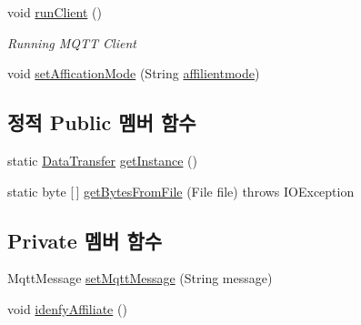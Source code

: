 \begin{DoxyCompactItemize}
\item 
void \mbox{\hyperlink{classcom_1_1github_1_1aites_1_1framework_1_1communicate_1_1_data_transfer_a17b21e4cd10c17d048a6c78dd8128981}{run\+Client}} ()
\begin{DoxyCompactList}\small\item\em Running M\+Q\+TT Client \end{DoxyCompactList}\item 
void \mbox{\hyperlink{classcom_1_1github_1_1aites_1_1framework_1_1communicate_1_1_data_transfer_a458adf74b705679f6c70a746e729b449}{set\+Affication\+Mode}} (String \mbox{\hyperlink{classcom_1_1github_1_1aites_1_1framework_1_1communicate_1_1_data_transfer_a15377742659a03248cb9cbdd4f691386}{affilientmode}})
\end{DoxyCompactItemize}
\subsection*{정적 Public 멤버 함수}
\begin{DoxyCompactItemize}
\item 
static \mbox{\hyperlink{classcom_1_1github_1_1aites_1_1framework_1_1communicate_1_1_data_transfer}{Data\+Transfer}} \mbox{\hyperlink{classcom_1_1github_1_1aites_1_1framework_1_1communicate_1_1_data_transfer_a0add9f40d6822234a5ac9f3412ede673}{get\+Instance}} ()
\item 
static byte \mbox{[}$\,$\mbox{]} \mbox{\hyperlink{classcom_1_1github_1_1aites_1_1framework_1_1communicate_1_1_data_transfer_a8eb17deab26fac405a47ba24209f82ed}{get\+Bytes\+From\+File}} (File file)  throws I\+O\+Exception 
\end{DoxyCompactItemize}
\subsection*{Private 멤버 함수}
\begin{DoxyCompactItemize}
\item 
Mqtt\+Message \mbox{\hyperlink{classcom_1_1github_1_1aites_1_1framework_1_1communicate_1_1_data_transfer_a16f821387f67b2cbe407162b318f0023}{set\+Mqtt\+Message}} (String message)
\item 
void \mbox{\hyperlink{classcom_1_1github_1_1aites_1_1framework_1_1communicate_1_1_data_transfer_ab7f4dcfffcf7bf80fcee0e4d6cd1b1cc}{idenfy\+Affiliate}} ()
\end{DoxyCompactItemize}
